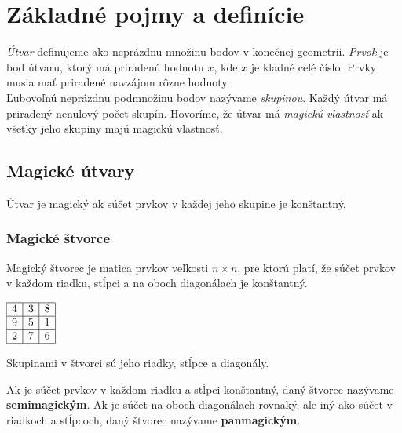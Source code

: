 \chapter{Základné pojmy a definície}

\label{kap:definitions} %

\textit{Útvar} definujeme ako neprázdnu množinu bodov v konečnej geometrii. \textit{Prvok} je bod útvaru, ktorý má priradenú hodnotu $x$, kde $x$ je kladné celé číslo. Prvky musia mať priradené navzájom rôzne hodnoty. \\

Ľubovoľnú neprázdnu podmnožinu bodov nazývame \textit{skupinou}. Každý útvar má priradený nenulový počet skupín. Hovoríme, že útvar má \textit{magickú vlastnosť} ak všetky jeho skupiny majú magickú vlastnosť.

\section{Magické útvary}
\begin{definition} Útvar je magický ak súčet prvkov v každej jeho skupine je konštantný.
\end{definition}

\subsection{Magické štvorce}
\begin{definition} Magický štvorec je matica prvkov veľkosti $n \times n$, pre ktorú platí, že súčet prvkov v každom riadku, stĺpci a na oboch diagonálach je konštantný.
\end{definition}

\begin{center}
$\begin{array}{ |c|c|c| } 
\hline
4 & 3 & 8 \\ 
\hline
9 & 5 & 1 \\ 
\hline
2 & 7 & 6 \\
\hline
\end{array}$
\end{center}

Skupinami v štvorci sú jeho riadky, stĺpce a diagonály.

\begin{note} Ak je súčet prvkov v každom riadku a stĺpci konštantný, daný štvorec nazývame \textbf{semimagickým}. Ak je súčet na oboch diagonálach rovnaký, ale iný ako súčet v riadkoch a stĺpcoch, daný štvorec nazývame \textbf{panmagickým}.
\end{note}

